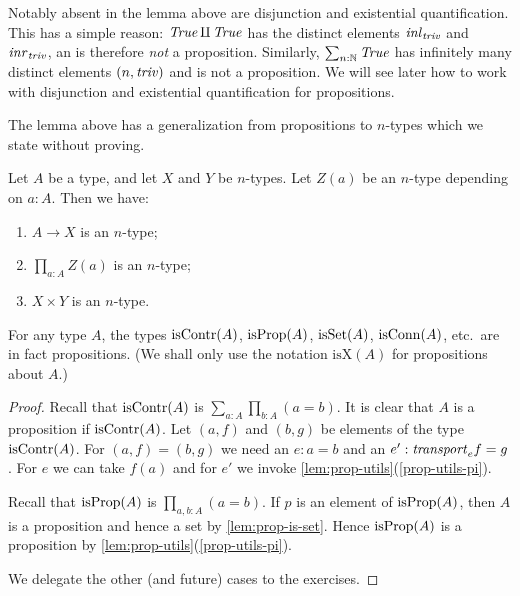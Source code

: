 Notably absent in the lemma above are disjunction
and existential quantification. This has a simple reason:
$\mathop{\mathit{True}}\amalg \mathop{\mathit{True}}$ has the distinct elements
$\mathop{{\it inl}_{\mathop{\mathit{triv}}}}$ and $\mathop{{\it inr}_{\mathop{\mathit{triv}}}}$, an is therefore \emph{not} a proposition.
Similarly, $\sum_{n:\mathbb{N}} \mathop{\mathit{True}}$ has infinitely many
distinct elements $(n,\mathop{\mathit{triv}})$ and is not a proposition. We will see later how
to work with disjunction and existential quantification for propositions.

The lemma above has a generalization from propositions to
$n$-types which we state without proving.

\begin{lemma}\label{lem:level-n-utils}
Let $A$ be a type, and let $X$ and $Y$ be $n$-types.
Let $Z(a)$ be an $n$-type depending on $a:A$. Then we have:
\begin{enumerate}
\item\label{level-n-utils-implication} $A\to X$ is an $n$-type;
\item\label{level-n-utils-pi} $\prod_{a:A} Z(a)$ is an $n$-type;
\item\label{level-n-utils-times} $X\times Y$ is an $n$-type.
\end{enumerate}
\end{lemma}

\begin{lemma}\label{lem:props-are-props}
  For any type $A$, the types 
$\mathrm{isContr}(A)$, $\mathrm{isProp}(A)$, $\mathrm{isSet}(A)$, $\mathrm{isConn}(A)$, 
etc.\ are in fact propositions.
(We shall only use the notation $\mathrm{isX}(A)$ for propositions about $A$.)
\end{lemma}

\begin{proof}
Recall that $\mathrm{isContr}(A)$ is $\sum_{a:A} \prod_{b:A} (a=b)$.
It is clear that $A$ is a proposition if $\mathrm{isContr}(A)$.
Let $(a,f)$ and $(b,g)$ be elements of the type $\mathrm{isContr}(A)$.
For $(a,f) = (b,g)$ we need an $e : a=b$ and an $e' : \mathord{\mathit{transport}}_e f = g$.
For $e$ we can take $f(a)$ and for $e'$ we invoke 
\cref{lem:prop-utils}(\ref{prop-utils-pi}).

Recall that $\mathrm{isProp}(A)$ is $\prod_{a,b:A}(a=b)$.
If $p$ is an element of $\mathrm{isProp}(A)$, then $A$ is a proposition
and hence a set by \cref{lem:prop-is-set}. Hence $\mathrm{isProp}(A)$
is a proposition by \cref{lem:prop-utils}(\ref{prop-utils-pi}).

We delegate the other (and future) cases to the exercises.
\end{proof}






